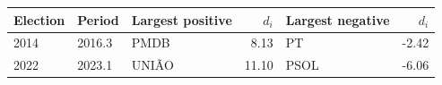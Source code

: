 \begin{tabular}{lllrlr}
\toprule
Election & Period & Largest positive & \(d_i\) & Largest negative & \(d_i\) \\
\midrule
2014 & 2016.3 & PMDB & 8.13 & PT & -2.42 \\
2022 & 2023.1 & UNIÃO & 11.10 & PSOL & -6.06 \\
\bottomrule
\end{tabular}
